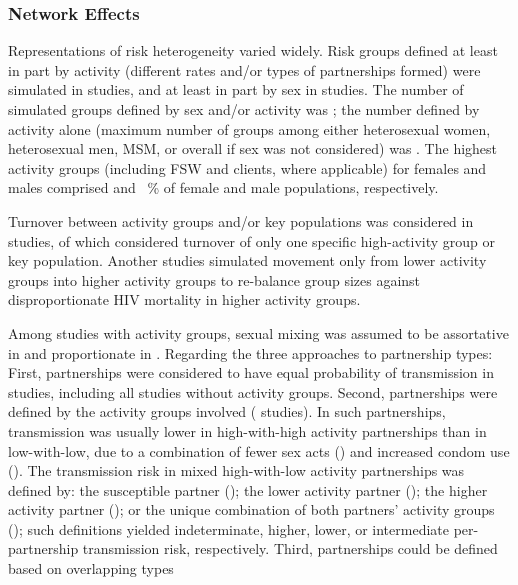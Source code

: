 \subsubsection{Network Effects}
\label{sss:res:network}
Representations of risk heterogeneity varied widely.
Risk groups defined at least in part by activity
(different rates and/or types of partnerships formed) were simulated in  studies,
and at least in part by sex in  studies.
The number of simulated groups defined by sex and/or activity was ;
the number defined by activity alone (maximum number of groups among either
heterosexual women, heterosexual men, MSM, or overall if sex was not considered) was .
The highest activity groups (including FSW and clients, where applicable) for females and males comprised
 and ~\% of female and male populations, respectively.
\par
Turnover between activity groups and/or key populations
was considered in  studies,
of which  considered turnover of only
one specific high-activity group or key population.
Another  studies simulated
movement only from lower activity groups into higher activity groups
to re-balance group sizes against disproportionate HIV mortality in higher activity groups.
\par
Among  studies with activity groups, sexual mixing was assumed to be
assortative in  and proportionate in .
Regarding the three approaches to partnership types:
First, partnerships were considered to have equal probability of transmission in
 studies, including all studies without activity groups.
Second, partnerships were defined by the activity groups involved ( studies).
In such partnerships, transmission was usually
lower in high-with-high activity partnerships than in low-with-low, due to a combination of
fewer sex acts () and
increased condom use ().
The transmission risk in mixed high-with-low activity partnerships was defined by:
the susceptible partner ();
the lower activity partner ();
the higher activity partner (); or
the unique combination of both partners' activity groups ();
such definitions yielded indeterminate, higher, lower, or intermediate
per-partnership transmission risk, respectively.
Third, partnerships could be defined based on overlapping types
